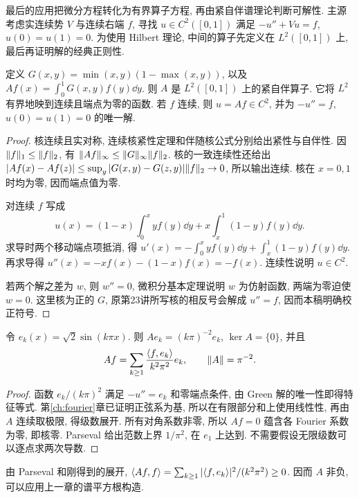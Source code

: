 \label{ch:dirichlet}
最后的应用把微分方程转化为有界算子方程, 再由紧自伴谱理论判断可解性. 主源考虑实连续势 $V$ 与连续右端 $f$, 寻找 $u\in C^2([0,1])$ 满足 $-u''+Vu=f$, $u(0)=u(1)=0$. 为使用 Hilbert 理论, 中间的算子先定义在 $L^2([0,1])$ 上, 最后再证明解的经典正则性.

\begin{theorem}\label{thm:green}
定义 $G(x,y)=\min(x,y)(1-\max(x,y))$, 以及 $Af(x)=\int_0^1G(x,y)f(y)\dd y$. 则 $A$ 是 $L^2([0,1])$ 上的紧自伴算子. 它将 $L^2$ 有界地映到连续且端点为零的函数. 若 $f$ 连续, 则 $u=Af\in C^2$, 并为 $-u''=f$, $u(0)=u(1)=0$ 的唯一解.
\end{theorem}
\begin{proof}
核连续且实对称, 连续核紧性定理和伴随核公式分别给出紧性与自伴性. 因 $\lVert f\rVert_1\le\lVert f\rVert_2$, 有 $\lVert Af\rVert_\infty\le\lVert G\rVert_\infty\lVert f\rVert_2$. 核的一致连续性还给出
$|Af(x)-Af(z)|\le\sup_y|G(x,y)-G(z,y)|\lVert f\rVert_2\to0$,
所以输出连续. 核在 $x=0,1$ 时均为零, 因而端点值为零.

对连续 $f$ 写成
\[
u(x)=(1-x)\int_0^xyf(y)\dd y+x\int_x^1(1-y)f(y)\dd y.
\]
求导时两个移动端点项抵消, 得 $u'(x)=-\int_0^xyf(y)\dd y+\int_x^1(1-y)f(y)\dd y$. 再求导得 $u''(x)=-xf(x)-(1-x)f(x)=-f(x)$. 连续性说明 $u\in C^2$.

若两个解之差为 $w$, 则 $w''=0$, 微积分基本定理说明 $w$ 为仿射函数, 两端为零迫使 $w=0$. 这里核为正的 $G$, 原第23讲所写核的相反号会解成 $u''=f$, 因而本稿明确校正符号.
\end{proof}

\begin{theorem}\label{thm:greenspec}
令 $e_k(x)=\sqrt2\sin(k\pi x)$. 则 $Ae_k=(k\pi)^{-2}e_k$, $\ker A=\{0\}$, 并且
\[
Af=\sum_{k\ge1}\frac{\langle f,e_k\rangle}{k^2\pi^2}e_k,
\qquad \lVert A\rVert=\pi^{-2}.
\]
\end{theorem}
\begin{proof}
函数 $e_k/(k\pi)^2$ 满足 $-u''=e_k$ 和零端点条件, 由 Green 解的唯一性即得特征等式. 第\ref{ch:fourier}章已证明正弦系为基, 所以在有限部分和上使用线性性, 再由 $A$ 连续取极限, 得级数展开. 所有对角系数非零, 所以 $Af=0$ 蕴含各 Fourier 系数为零, 即核零. Parseval 给出范数上界 $1/\pi^2$, 在 $e_1$ 上达到. 不需要假设无限级数可以逐点求两次导数.
\end{proof}

由 Parseval 和刚得到的展开, $\langle Af,f\rangle=\sum_{k\ge1}|\langle f,e_k\rangle|^2/(k^2\pi^2)\ge0$. 因而 $A$ 非负, 可以应用上一章的谱平方根构造.

